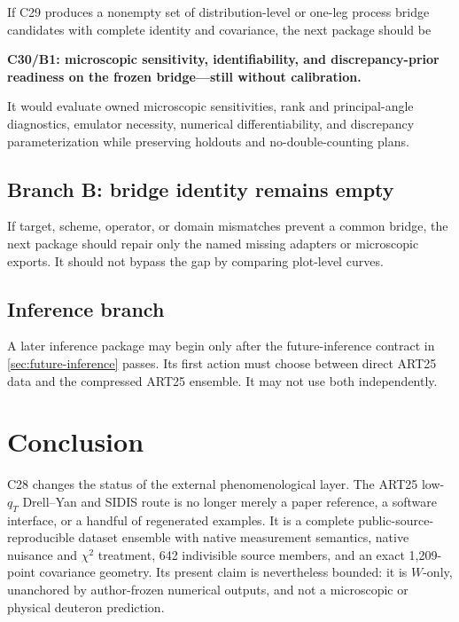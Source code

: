 \documentclass[11pt]{article}
\begin{document}
If C29 produces a nonempty set of distribution-level or one-leg process bridge candidates with complete identity and covariance, the next package should be
\begin{center}
\textbf{C30/B1: microscopic sensitivity, identifiability, and discrepancy-prior readiness on the frozen bridge---still without calibration.}
\end{center}
It would evaluate owned microscopic sensitivities, rank and principal-angle diagnostics, emulator necessity, numerical differentiability, and discrepancy parameterization while preserving holdouts and no-double-counting plans.

\subsection{Branch B: bridge identity remains empty}

If target, scheme, operator, or domain mismatches prevent a common bridge, the next package should repair only the named missing adapters or microscopic exports.  It should not bypass the gap by comparing plot-level curves.

\subsection{Inference branch}

A later inference package may begin only after the future-inference contract in \cref{sec:future-inference} passes.  Its first action must choose between direct ART25 data and the compressed ART25 ensemble.  It may not use both independently.

\section{Conclusion}
\label{sec:conclusion}

C28 changes the status of the external phenomenological layer.  The ART25 low-\(q_T\) Drell--Yan and SIDIS route is no longer merely a paper reference, a software interface, or a handful of regenerated examples.  It is a complete public-source-reproducible dataset ensemble with native measurement semantics, native nuisance and \(\chi^2\) treatment, 642 indivisible source members, and an exact 1,209-point covariance geometry.  Its present claim is nevertheless bounded: it is \(W\)-only, unanchored by author-frozen numerical outputs, and not a microscopic or physical deuteron prediction.
\end{document}
